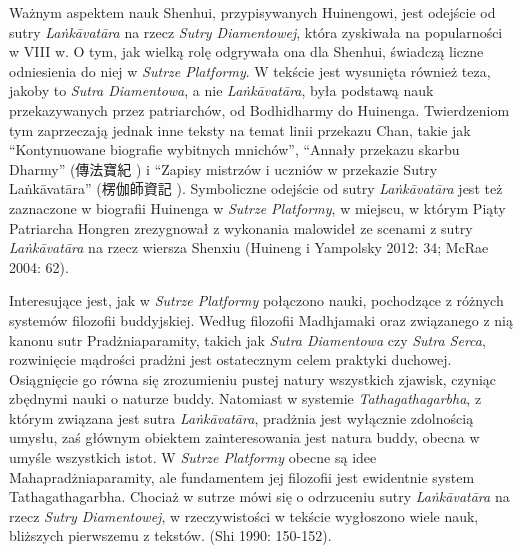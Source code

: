 Ważnym aspektem nauk Shenhui, przypisywanych Huinengowi, jest odejście od sutry \textit{La\.nkā\-vatāra} na rzecz \textit{Sutry Diamentowej}, która zyskiwała na popularności w VIII w.
O tym, jak wielką rolę odgrywała ona dla Shenhui, świadczą liczne odniesienia do niej w \textit{Sutrze Platformy}.
W tekście jest wysunięta również teza, jakoby to \textit{Sutra Diamentowa}, a nie \textit{La\.nkāvatāra}, była podstawą nauk przekazywanych przez patriarchów, od Bodhidharmy do Huinenga.
Twierdzeniom tym zaprzeczają jednak inne teksty na temat linii przekazu Chan, takie jak ``Kontynuowane biografie wybitnych mnichów'', ``Annały przekazu skarbu Dharmy'' (傳法寶紀 ) i ``Zapisy mistrzów i uczniów w przekazie Sutry La\.nkāvatāra'' (楞伽師資記 ).
Symboliczne odejście od sutry \textit{La\.nkāvatāra} jest też zaznaczone w biografii Huinenga w \textit{Sutrze Platformy}, w miejscu, w którym Piąty Patriarcha Hongren zrezygnował z wykonania malowideł ze scenami z sutry \textit{La\.nkāvatāra} na rzecz wiersza Shenxiu (Huineng i Yampolsky 2012: 34; McRae 2004: 62).

Interesujące jest, jak w \textit{Sutrze Platformy} połączono nauki, pochodzące z różnych systemów filozofii buddyjskiej.
Według filozofii Madhjamaki oraz związanego z nią kanonu sutr Pradżniaparamity, takich jak \textit{Sutra Diamentowa} czy \textit{Sutra Serca}, rozwinięcie mądrości pradżni jest ostatecznym celem praktyki duchowej.
Osiągnięcie go równa się zrozumieniu pustej natury wszystkich zjawisk, czyniąc zbędnymi nauki o naturze buddy.
Natomiast w systemie \textit{Tathagathagarbha}, z którym związana jest sutra \textit{La\.nkā\-vatāra}, pradżnia jest wyłącznie zdolnością umysłu, zaś głównym obiektem zainteresowania jest natura buddy, obecna w umyśle wszystkich istot.
W \textit{Sutrze Platformy} obecne są idee Mahapradżniaparamity, ale fundamentem jej filozofii jest ewidentnie system Tathagathagarbha.
Chociaż w sutrze mówi się o odrzuceniu sutry \textit{La\.nkā\-vatāra} na rzecz \textit{Sutry Diamentowej}, w rzeczywistości w tekście wygłoszono wiele nauk, bliższych pierwszemu z tekstów.
(Shi 1990: 150-152).

